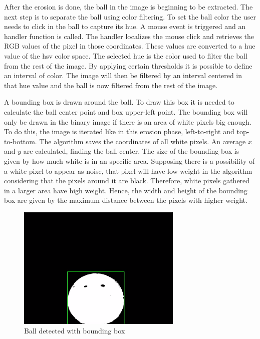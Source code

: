 After the erosion is done, the ball in the image is beginning to be extracted. The next step is to separate the ball using color filtering. To set the ball color the user needs to click in the ball to capture its hue. A mouse event is triggered and an handler function is called. The handler localizes the mouse click and retrieves the RGB values of the pixel in those coordinates. These values are converted to a hue value of the \gls{hsv} color space. The selected hue is the color used to filter the ball from the rest of the image. By applying certain thresholds it is possible to define an interval of color. The image will then be filtered by an interval centered in that hue value and the ball is now filtered from the rest of the image. 

A bounding box is drawn around the ball. To draw this box it is needed to calculate the ball center point and box upper-left point. The bounding box will only be drawn in the binary image if there is an area of white pixels big enough. To do this, the image is iterated like in this erosion phase, left-to-right and top-to-bottom. The algorithm saves the coordinates of all white pixels. An average $x$ and $y$ are calculated, finding the ball center. The size of the bounding box is given by how much white is in an specific area. Supposing there is a possibility of a white pixel to appear as noise, that pixel will have low weight in the algorithm considering that the pixels around it are black. Therefore, white pixels gathered in a larger area have high weight. Hence, the width and height of the bounding box are given by the maximum distance between the pixels with higher weight.


\begin{figure}[htp]
	
	\centering
	\includegraphics[width=0.7\textwidth]{capcalib/imgs/ball_detect.png}
	
	\caption{Ball detected with bounding box}
	\label{fig:balldetect}
	
\end{figure}

